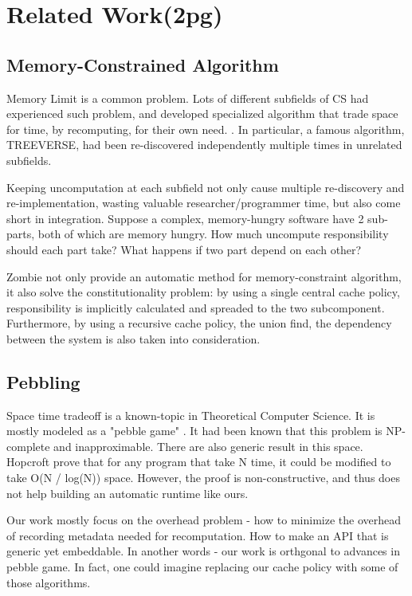 \section{Related Work(2pg)}
\subsection{Memory-Constrained Algorithm}
Memory Limit is a common problem. Lots of different subfields of CS had experienced such problem, and developed specialized algorithm that trade space for time, by recomputing, for their own need. . In particular, a famous algorithm, TREEVERSE, had been re-discovered independently multiple times in unrelated subfields.

Keeping uncomputation at each subfield not only cause multiple re-discovery and re-implementation, wasting valuable researcher/programmer time, but also come short in integration. Suppose a complex, memory-hungry software have 2 sub-parts, both of which are memory hungry. How much uncompute responsibility should each part take? What happens if two part depend on each other?

Zombie not only provide an automatic method for memory-constraint algorithm, it also solve the constitutionality problem: by using a single central cache policy, responsibility is implicitly calculated and spreaded to the two subcomponent. Furthermore, by using a recursive cache policy, the union find, the dependency between the system is also taken into consideration.
\subsection{Pebbling}
Space time tradeoff is a known-topic in Theoretical Computer Science. It is mostly modeled as a "pebble game" . It had been known that this problem is NP-complete and inapproximable. There are also generic result in this space. Hopcroft prove that for any program that take N time, it could be modified to take O(N / log(N)) space. However, the proof is non-constructive, and thus does not help building an automatic runtime like ours.

Our work mostly focus on the overhead problem - how to minimize the overhead of recording metadata needed for recomputation. How to make an API that is generic yet embeddable. In another words - our work is orthgonal to advances in pebble game. In fact, one could imagine replacing our cache policy with some of those algorithms.


